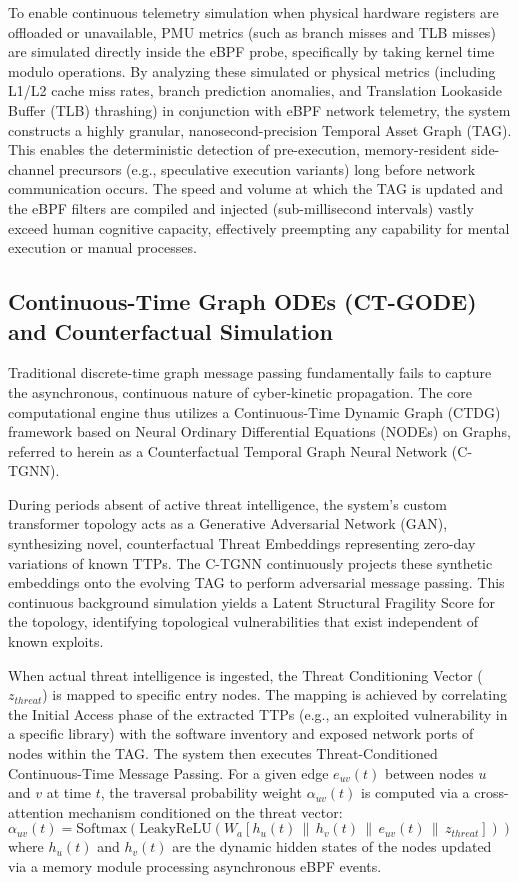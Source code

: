 \documentclass[12pt, letterpaper]{article}
\begin{document}
To enable continuous telemetry simulation when physical hardware registers are offloaded or unavailable, PMU metrics (such as branch misses and TLB misses) are simulated directly inside the eBPF probe, specifically by taking kernel time modulo operations. By analyzing these simulated or physical metrics (including L1/L2 cache miss rates, branch prediction anomalies, and Translation Lookaside Buffer (TLB) thrashing) in conjunction with eBPF network telemetry, the system constructs a highly granular, nanosecond-precision Temporal Asset Graph (TAG). This enables the deterministic detection of pre-execution, memory-resident side-channel precursors (e.g., speculative execution variants) long before network communication occurs. The speed and volume at which the TAG is updated and the eBPF filters are compiled and injected (sub-millisecond intervals) vastly exceed human cognitive capacity, effectively preempting any capability for mental execution or manual processes.

\subsection{Continuous-Time Graph ODEs (CT-GODE) and Counterfactual Simulation}
Traditional discrete-time graph message passing fundamentally fails to capture the asynchronous, continuous nature of cyber-kinetic propagation. The core computational engine thus utilizes a Continuous-Time Dynamic Graph (CTDG) framework based on Neural Ordinary Differential Equations (NODEs) on Graphs, referred to herein as a Counterfactual Temporal Graph Neural Network (C-TGNN).

During periods absent of active threat intelligence, the system's custom transformer topology acts as a Generative Adversarial Network (GAN), synthesizing novel, counterfactual Threat Embeddings representing zero-day variations of known TTPs. The C-TGNN continuously projects these synthetic embeddings onto the evolving TAG to perform adversarial message passing. This continuous background simulation yields a Latent Structural Fragility Score for the topology, identifying topological vulnerabilities that exist independent of known exploits. 

When actual threat intelligence is ingested, the Threat Conditioning Vector ($z_{\mathit{threat}}$) is mapped to specific entry nodes. The mapping is achieved by correlating the Initial Access phase of the extracted TTPs (e.g., an exploited vulnerability in a specific library) with the software inventory and exposed network ports of nodes within the TAG. The system then executes Threat-Conditioned Continuous-Time Message Passing. For a given edge $e_{uv}(t)$ between nodes $u$ and $v$ at time $t$, the traversal probability weight $\alpha_{uv}(t)$ is computed via a cross-attention mechanism conditioned on the threat vector:
$$\alpha_{uv}(t) = \text{Softmax}(\text{LeakyReLU}(W_a [ h_u(t) \,\|\, h_v(t) \,\|\, e_{uv}(t) \,\|\, z_{\mathit{threat}} ]))$$
where $h_u(t)$ and $h_v(t)$ are the dynamic hidden states of the nodes updated via a memory module processing asynchronous eBPF events. 
\end{document}
